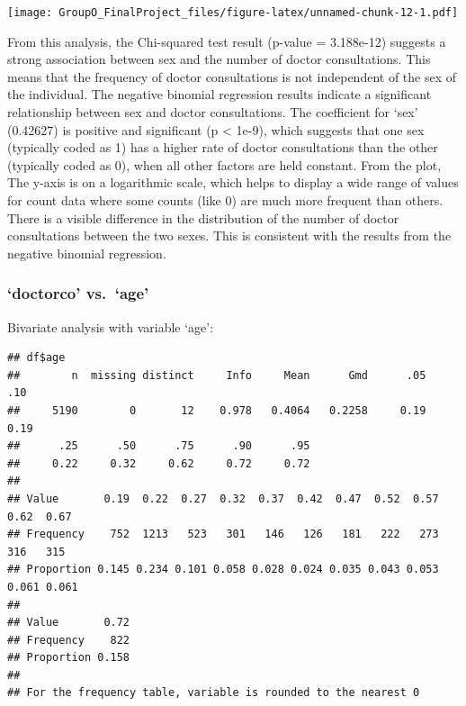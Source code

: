 \documentclass[
]{article}
\newenvironment{Shaded}{\begin{snugshade}}{\end{snugshade}}
\newcommand{\FunctionTok}[1]{\textcolor[rgb]{0.13,0.29,0.53}{\textbf{#1}}}
\newcommand{\NormalTok}[1]{#1}
\newcommand{\SpecialCharTok}[1]{\textcolor[rgb]{0.81,0.36,0.00}{\textbf{#1}}}
\begin{document}
\texttt{[image: GroupO\_FinalProject\_files/figure-latex/unnamed-chunk-12-1.pdf]}

From this analysis, the Chi-squared test result (p-value = 3.188e-12)
suggests a strong association between sex and the number of doctor
consultations. This means that the frequency of doctor consultations is
not independent of the sex of the individual. The negative binomial
regression results indicate a significant relationship between sex and
doctor consultations. The coefficient for `sex' (0.42627) is positive
and significant (p \textless{} 1e-9), which suggests that one sex
(typically coded as 1) has a higher rate of doctor consultations than
the other (typically coded as 0), when all other factors are held
constant. From the plot, The y-axis is on a logarithmic scale, which
helps to display a wide range of values for count data where some counts
(like 0) are much more frequent than others. There is a visible
difference in the distribution of the number of doctor consultations
between the two sexes. This is consistent with the results from the
negative binomial regression.

\subsubsection{`doctorco' vs.~`age'}\label{doctorco-vs.-age}

Bivariate analysis with variable `age':

\begin{Shaded}
\end{Shaded}

\begin{verbatim}
## df$age 
##        n  missing distinct     Info     Mean      Gmd      .05      .10 
##     5190        0       12    0.978   0.4064   0.2258     0.19     0.19 
##      .25      .50      .75      .90      .95 
##     0.22     0.32     0.62     0.72     0.72 
##                                                                             
## Value       0.19  0.22  0.27  0.32  0.37  0.42  0.47  0.52  0.57  0.62  0.67
## Frequency    752  1213   523   301   146   126   181   222   273   316   315
## Proportion 0.145 0.234 0.101 0.058 0.028 0.024 0.035 0.043 0.053 0.061 0.061
##                 
## Value       0.72
## Frequency    822
## Proportion 0.158
## 
## For the frequency table, variable is rounded to the nearest 0
\end{verbatim}
\end{document}
